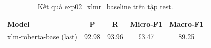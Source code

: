 \begin{table}[t]
\centering
\begin{tabular}{lcccc}
\hline
\textbf{Model} & \textbf{P} & \textbf{R} & \textbf{Micro-F1} & \textbf{Macro-F1} \\
\hline
xlm-roberta-base (last) & 92.98 & 93.96 & 93.47 & 89.25 \\
\hline
\end{tabular}
\caption{Kết quả exp02_xlmr_baseline trên tập test.}
\label{tab:main}
\end{table}